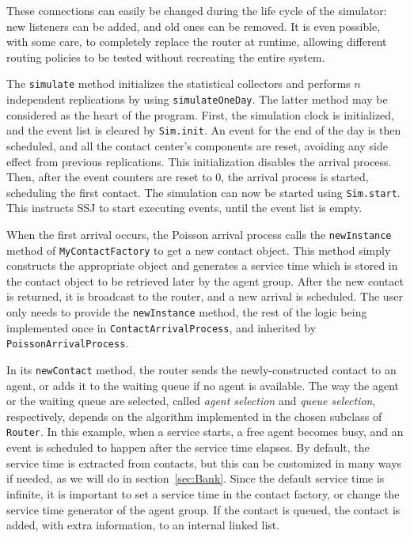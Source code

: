 These
connections can easily be changed during the life cycle of the
simulator:  new listeners can be added, and old ones can be removed.
It is even possible, with some care, to completely replace the router
at runtime, allowing different routing policies to be tested without
recreating the entire system.

The \texttt{simulate} method initializes the statistical collectors
and performs $n$ independent replications by using
\texttt{simulate\-One\-Day}.  The latter method may be considered as
the heart of the program.  First, the simulation clock is initialized, and
the event list is cleared by \texttt{Sim.init}.  An event for the end
of the day is then scheduled, and
all the contact center's components are reset, avoiding
any side effect from previous replications.  This initialization
disables the arrival
process.  Then, after the event
counters are reset to 0, the arrival process is started, scheduling
the first contact.  The simulation can now be started using
\texttt{Sim.start}.  This instructs SSJ to start executing events,
until the event list is empty.

When the first arrival occurs, the Poisson arrival process calls the
\texttt{new\-Instance} method of \texttt{My\-Contact\-Factory} to get
a new  contact object.
This method simply constructs the appropriate object and generates a
service time which is stored in the
contact object to be retrieved later by the agent group.
After the new contact is returned, it is broadcast to the router, and a
new arrival is scheduled.  The user only needs to
provide the \texttt{new\-Instance} method, the rest of the logic being
implemented once in \texttt{Contact\-Arrival\-Process}, and inherited by
\texttt{Poisson\-Arrival\-Process}.

In its \texttt{new\-Contact} method,
the router sends the newly-constructed contact to an agent, or
adds it to the waiting queue if no agent is available.
The way the agent or the waiting queue are selected, called \emph{agent
  selection} and \emph{queue selection}, respectively, depends on the
algorithm implemented in the chosen subclass of \texttt{Router}.
In this example,
when a service starts, a free agent becomes busy, and an event is
scheduled to happen after the service time elapses.
By default, the service time is extracted from contacts, but this can
be customized in many ways if needed, as we will do in
section~\ref{sec:Bank}.
Since the default service time is infinite, it is important to set a
service time in the contact factory, or change the service time
generator of the agent group.
If the contact is queued, the contact is added, with extra
information, to an internal linked list.


